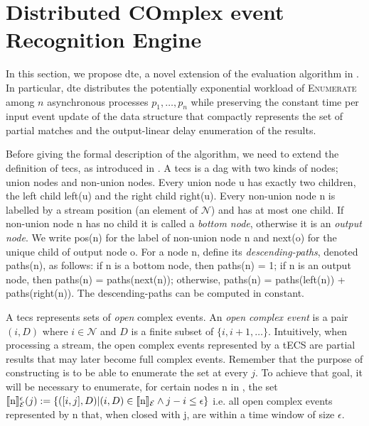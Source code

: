 \chapter{Distributed COmplex event Recognition Engine}\label{chapter:algorithm}


In this section, we propose \acrfull{dte}, a novel extension of the evaluation algorithm in \cite{core}. In particular, \acrshort{dte} distributes the potentially exponential workload of \textsc{Enumerate} among $n$ asynchronous processes $p_{1}, \ldots, p_{n}$ while preserving the constant time per input event update of the data structure that compactly represents the set of partial matches and the output-linear delay enumeration of the results.

Before giving the formal description of the algorithm, we need to extend the definition of \acrfull{tecs}, as introduced in \cite{core}. A \acrshort{tecs} is a \acrfull{dag} \tecs with two kinds of nodes; union nodes and non-union nodes. Every union node u has exactly two children, the left child left(u) and the right child right(u). Every non-union node n is labelled by a stream position (an element of $\mathcal{N}$) and has at most one child. If non-union node n has no child it is called a \emph{bottom node}, otherwise it is an \emph{output node}. We write pos(n) for the label of non-union node n and next(o) for the unique child of output node o. For a node n, define its \emph{descending-paths}, denoted paths(n), as follows: if n is a bottom node, then paths(n) = 1; if n is an output node, then paths(n) = paths(next(n)); otherwise, paths(n) = paths(left(n)) + paths(right(n)). The descending-paths can be computed in constant.

A \acrshort{tecs} represents sets of \emph{open} complex events. An \emph{open complex event} is a pair $(i, D)$ where $i \in \mathcal{N}$ and $D$ is a finite subset of $\{i, i+1, \ldots\}$. Intuitively, when processing a stream, the open complex events represented by a tECS are partial results that may later become full complex events. Remember that the purpose of constructing \tecs is to be able to enumerate the set \enumCEA at every $j$. To achieve that goal, it will be necessary to enumerate, for certain nodes n in \tecs, the set $\llbracket \text{n} \rrbracket^{\epsilon}_{\mathcal{E}}(j) := \{ ([i, j], D) | (i, D) \in \llbracket \text{n} \rrbracket_{\mathcal{E}} \land j - i \leq \epsilon \}$ i.e. all open complex events represented by n that, when closed with j, are within a time window of size $\epsilon$.

